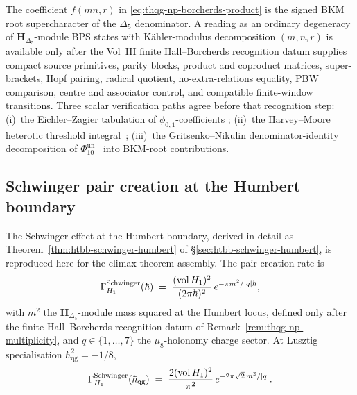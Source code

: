 \begin{remark}
\label{rem:thqg-np-multiplicity}
The coefficient $f(mn,r)$ in \eqref{eq:thqg-np-borcherds-product} is
the signed BKM root supercharacter of the $\Delta_5$ denominator.  A
reading as an ordinary degeneracy of
$\mathbf{H}_{\Delta_5}$-module BPS states with K\"ahler-modulus
decomposition $(m,n,r)$ is available only after the Vol~III finite
Hall--Borcherds recognition datum supplies compact source primitives,
parity blocks, product and coproduct matrices, super-brackets, Hopf
pairing, radical quotient, no-extra-relations equality, PBW comparison,
centre and associator control, and compatible finite-window transitions.
Three scalar verification paths agree before that recognition step:
(i)~the Eichler--Zagier tabulation of $\phi_{0,1}$-coefficients
\cite[\S 9]{EichlerZagier1985}; (ii)~the Harvey--Moore heterotic threshold
integral~\cite[\S 4]{HarveyMoore1996}; (iii)~the
Gritsenko--Nikulin denominator-identity decomposition of
$\Phi_{10}^{\mathrm{un}}$~\cite[Thm.~2.1]{GritsenkoNikulin1998} into BKM-root
contributions.
\end{remark}

\subsection{Schwinger pair creation at the Humbert boundary}
\label{subsec:thqg-np-schwinger-boundary}

The Schwinger effect at the Humbert boundary, derived in detail as
Theorem~\ref{thm:htbb-schwinger-humbert} of
\S\ref{sec:htbb-schwinger-humbert}, is reproduced here for the
climax-theorem assembly. The pair-creation rate is
\begin{equation}\label{eq:thqg-np-schwinger-rate}
 \Gamma^{\mathrm{Schwinger}}_{H_1}(\hbar)
 \;=\; \frac{(\operatorname{vol} H_1)^2}{(2\pi\hbar)^2}\,e^{-\pi m^2/|q|\hbar},
\end{equation}
with $m^2$ the $\mathbf{H}_{\Delta_5}$-module mass squared at the
Humbert locus, defined only after the finite Hall--Borcherds
recognition datum of Remark~\ref{rem:thqg-np-multiplicity}, and
$q\in\{1, \ldots, 7\}$ the $\mu_8$-holonomy charge sector. At Lusztig
specialisation $\hbar_{\mathrm{qg}}^2 = -1/8$,
\[
 \Gamma^{\mathrm{Schwinger}}_{H_1}(\hbar_{\mathrm{qg}})
 \;=\; \frac{2(\operatorname{vol} H_1)^2}{\pi^2}\,e^{-2\pi\sqrt 2\,m^2/|q|}.
\]

